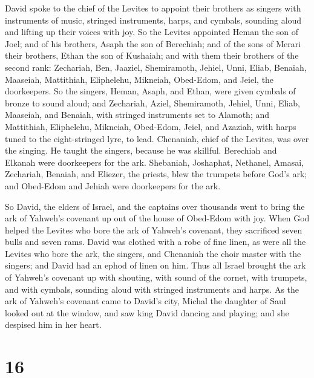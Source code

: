  David spoke to the chief of the Levites to appoint their
brothers as singers with instruments of music, stringed instruments,
harps, and cymbals, sounding aloud and lifting up their voices with joy.
 So the Levites appointed Heman the son of Joel; and of
his brothers, Asaph the son of Berechiah; and of the sons of Merari
their brothers, Ethan the son of Kushaiah;  and with them
their brothers of the second rank: Zechariah, Ben, Jaaziel, Shemiramoth,
Jehiel, Unni, Eliab, Benaiah, Maaseiah, Mattithiah, Eliphelehu,
Mikneiah, Obed-Edom, and Jeiel, the doorkeepers.  So the
singers, Heman, Asaph, and Ethan, were given cymbals of bronze to sound
aloud;  and Zechariah, Aziel, Shemiramoth, Jehiel, Unni,
Eliab, Maaseiah, and Benaiah, with stringed instruments set to Alamoth;
 and Mattithiah, Eliphelehu, Mikneiah, Obed-Edom, Jeiel,
and Azaziah, with harps tuned to the eight-stringed lyre, to lead.
 Chenaniah, chief of the Levites, was over the singing.
He taught the singers, because he was skillful. 
Berechiah and Elkanah were doorkeepers for the ark. 
Shebaniah, Joshaphat, Nethanel, Amasai, Zechariah, Benaiah, and Eliezer,
the priests, blew the trumpets before God's ark; and Obed-Edom and
Jehiah were doorkeepers for the ark.

 So David, the elders of Israel, and the captains over
thousands went to bring the ark of Yahweh's covenant up out of the house
of Obed-Edom with joy.  When God helped the Levites who
bore the ark of Yahweh's covenant, they sacrificed seven bulls and seven
rams.  David was clothed with a robe of fine linen, as
were all the Levites who bore the ark, the singers, and Chenaniah the
choir master with the singers; and David had an ephod of linen on him.
 Thus all Israel brought the ark of Yahweh's covenant up
with shouting, with sound of the cornet, with trumpets, and with
cymbals, sounding aloud with stringed instruments and harps.
 As the ark of Yahweh's covenant came to David's city,
Michal the daughter of Saul looked out at the window, and saw king David
dancing and playing; and she despised him in her heart.

\hypertarget{section-15}{%
\section{16}\label{section-15}}

